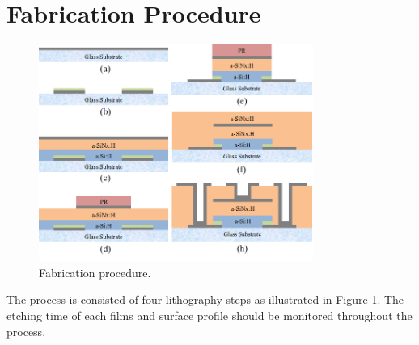 \section{Fabrication Procedure}
\begin{figure}[ht]
  \centering
  \includegraphics[width=0.8\textwidth]{ProcessFlow.png}
  \caption{Fabrication procedure.}
  \label{fig:TFT_Process}
\end{figure}
The process is consisted of four lithography steps as illustrated in Figure \ref{fig:TFT_Process}.  The etching time of each films and surface profile should be monitored throughout the process.
